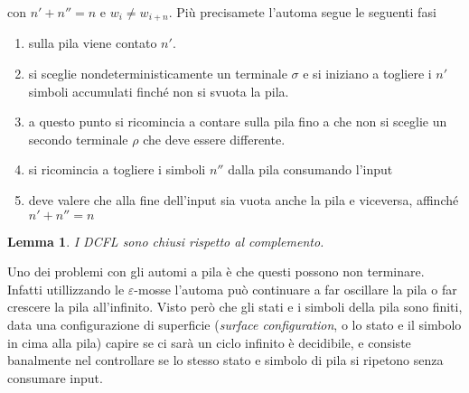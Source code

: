 \documentclass[12pt]{article}
\newtheorem{lemma}{Lemma}
\begin{document}
\begin{tcolorbox}[breakable]
\begin{center}
	\end{center}
	con $n' + n'' = n$ e $w_i \neq w_{i + n}$.
	Più precisamete l'automa segue le seguenti fasi
	\begin{enumerate}
		\item sulla pila viene contato $n'$.
		\item si sceglie nondeterministicamente un terminale $\sigma$ e si iniziano a togliere i $n'$ simboli accumulati finché non si svuota la pila.
		\item a questo punto si ricomincia a contare sulla pila fino a che non si sceglie un secondo terminale $\rho$ che deve essere differente.
		\item si ricomincia a togliere i simboli $n''$ dalla pila consumando l'input
		\item deve valere che alla fine dell'input sia vuota anche la pila e viceversa, affinché $n' + n'' = n$
	\end{enumerate}
\end{tcolorbox}

\begin{lemma}
	I DCFL sono chiusi rispetto al complemento.
\end{lemma}
Uno dei problemi con gli automi a pila è che questi possono non terminare.
Infatti utillizzando le $\varepsilon$-mosse l'automa può continuare a far oscillare la pila o far crescere la pila all'infinito.
Visto però che gli stati e i simboli della pila sono finiti, data una configurazione di superficie (\textit{surface configuration}, o lo stato e il simbolo in cima alla pila) capire se ci sarà un ciclo infinito è decidibile, e consiste banalmente nel controllare se lo stesso stato e simbolo di pila si ripetono senza consumare input.
\end{document}

